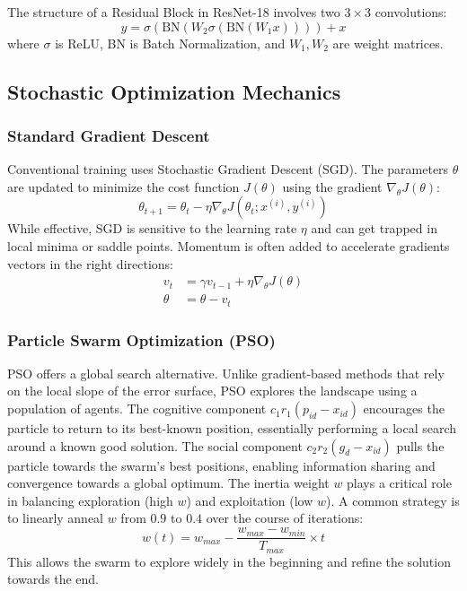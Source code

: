 \documentclass[journal]{IEEEtran}
\begin{document}
The structure of a Residual Block in ResNet-18 involves two $3 \times 3$ convolutions:
\begin{equation}
y = \sigma(\text{BN}(W_2 \sigma(\text{BN}(W_1 x)))) + x
\end{equation}
where $\sigma$ is ReLU, BN is Batch Normalization, and $W_1, W_2$ are weight matrices.

\subsection{Stochastic Optimization Mechanics}
\subsubsection{Standard Gradient Descent}
Conventional training uses Stochastic Gradient Descent (SGD). The parameters $\theta$ are updated to minimize the cost function $J(\theta)$ using the gradient $\nabla_\theta J(\theta)$:
\begin{equation}
\theta_{t+1} = \theta_t - \eta \nabla_\theta J(\theta_t; x^{(i)}, y^{(i)})
\end{equation}
While effective, SGD is sensitive to the learning rate $\eta$ and can get trapped in local minima or saddle points. Momentum is often added to accelerate gradients vectors in the right directions:
\begin{align}
v_t &= \gamma v_{t-1} + \eta \nabla_\theta J(\theta) \\
\theta &= \theta - v_t
\end{align}

\subsubsection{Particle Swarm Optimization (PSO)}
PSO offers a global search alternative. Unlike gradient-based methods that rely on the local slope of the error surface, PSO explores the landscape using a population of agents.
The cognitive component $c_1 r_1 (p_{id} - x_{id})$ encourages the particle to return to its best-known position, essentially performing a local search around a known good solution.
The social component $c_2 r_2 (g_{d} - x_{id})$ pulls the particle towards the swarm's best positions, enabling information sharing and convergence towards a global optimum.
The inertia weight $w$ plays a critical role in balancing exploration (high $w$) and exploitation (low $w$). A common strategy is to linearly anneal $w$ from $0.9$ to $0.4$ over the course of iterations:
\begin{equation}
w(t) = w_{max} - \frac{w_{max} - w_{min}}{T_{max}} \times t
\end{equation}
This allows the swarm to explore widely in the beginning and refine the solution towards the end.
\end{document}
